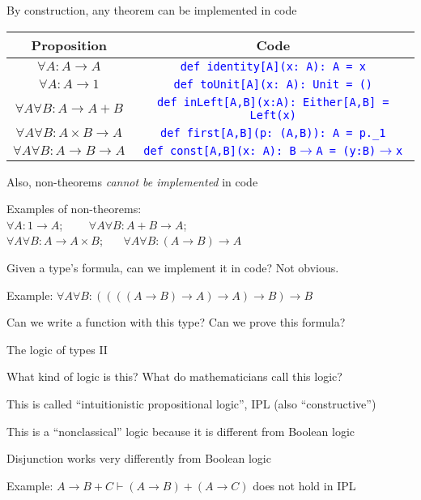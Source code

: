 By construction, any theorem can be implemented in code
\begin{center}
\begin{tabular}{|c|c|}
\hline 
\textbf{Proposition} & \textbf{Code}\tabularnewline
\hline 
\hline 
$\forall A:A\rightarrow A$ & \texttt{\textcolor{blue}{\footnotesize{}def identity{[}A{]}(x:\ A):\ A
= x}}\tabularnewline
\hline 
$\forall A:A\rightarrow1$ & \texttt{\textcolor{blue}{\footnotesize{}def toUnit{[}A{]}(x:\ A): Unit
= ()}}\tabularnewline
\hline 
$\forall A\forall B:A\rightarrow A+B$ & \texttt{\textcolor{blue}{\footnotesize{}def inLeft{[}A,B{]}(x:A):\ Either{[}A,B{]}
= Left(x)}}\tabularnewline
\hline 
$\forall A\forall B:A\times B\rightarrow A$ & \texttt{\textcolor{blue}{\footnotesize{}def first{[}A,B{]}(p:\ (A,B)):\ A
= p.\_1}}\tabularnewline
\hline 
$\forall A\forall B:A\rightarrow B\rightarrow A$ & \texttt{\textcolor{blue}{\footnotesize{}def const{[}A,B{]}(x:\ A):\ B$\rightarrow$A
= (y:B)$\rightarrow$x}}\tabularnewline
\hline 
\end{tabular}
\par\end{center}

Also, non-theorems \emph{cannot be implemented} in code 

Examples of non-theorems:\\
 $\forall A:1\rightarrow A$; \  \  $\quad\forall A\forall B:A+B\rightarrow A$;
\\
$\forall A\forall B:A\rightarrow A\times B$; \  $\quad\forall A\forall B:(A\rightarrow B)\rightarrow A$

Given a type\textsf{'}s formula, can we implement it in code? Not obvious.

Example: $\forall A\forall B:((((A\rightarrow B)\rightarrow A)\rightarrow A)\rightarrow B)\rightarrow B$

Can we write a function with this type? Can we prove this formula?

The logic of types II

What kind of logic is this? What do mathematicians call this logic?

This is called \textsf{``}intuitionistic propositional logic\textsf{''}, IPL (also
\textsf{``}constructive\textsf{''})

This is a \textsf{``}nonclassical\textsf{''} logic because it is different from Boolean
logic

Disjunction works very differently from Boolean logic

Example: $A\rightarrow B+C\vdash(A\rightarrow B)+(A\rightarrow C)$
does not hold in IPL

